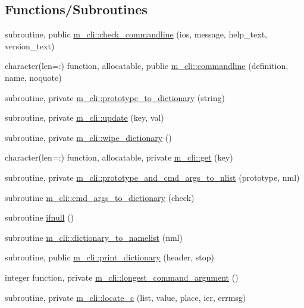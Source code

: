 \subsection*{Functions/\+Subroutines}
\begin{DoxyCompactItemize}
\item 
subroutine, public \mbox{\hyperlink{namespacem__cli_a62056f0c153eb63cb0b11a21edb028cd}{m\+\_\+cli\+::check\+\_\+commandline}} (ios, message, help\+\_\+text, version\+\_\+text)
\item 
character(len=\+:) function, allocatable, public \mbox{\hyperlink{namespacem__cli_a4f639b0c4bf16930fc1c5858ed4196a3}{m\+\_\+cli\+::commandline}} (definition, name, noquote)
\item 
subroutine, private \mbox{\hyperlink{namespacem__cli_a8c62537a2d224364c9cb30005be819e9}{m\+\_\+cli\+::prototype\+\_\+to\+\_\+dictionary}} (string)
\item 
subroutine, private \mbox{\hyperlink{namespacem__cli_a9b7676d796e5cb878ecd9294b8a689cb}{m\+\_\+cli\+::update}} (key, val)
\item 
subroutine, private \mbox{\hyperlink{namespacem__cli_a3c1b30406fc692841826be979726bb1b}{m\+\_\+cli\+::wipe\+\_\+dictionary}} ()
\item 
character(len=\+:) function, allocatable, private \mbox{\hyperlink{namespacem__cli_a45783c194a1484042f63c58b180ca8df}{m\+\_\+cli\+::get}} (key)
\item 
subroutine, private \mbox{\hyperlink{namespacem__cli_ac77d70573b34ade2079cc4004a6acba5}{m\+\_\+cli\+::prototype\+\_\+and\+\_\+cmd\+\_\+args\+\_\+to\+\_\+nlist}} (prototype, nml)
\item 
subroutine \mbox{\hyperlink{namespacem__cli_a89a63254465b02048f09541e51974764}{m\+\_\+cli\+::cmd\+\_\+args\+\_\+to\+\_\+dictionary}} (check)
\item 
subroutine \mbox{\hyperlink{M__CLI_8f90_aa26f90016621d1ee43d3b5b66316532b}{ifnull}} ()
\item 
subroutine \mbox{\hyperlink{namespacem__cli_a7e5041efcad56387232475a3ae728634}{m\+\_\+cli\+::dictionary\+\_\+to\+\_\+namelist}} (nml)
\item 
subroutine, public \mbox{\hyperlink{namespacem__cli_a5b6abaf1d5aec5e918be0759df29c849}{m\+\_\+cli\+::print\+\_\+dictionary}} (header, stop)
\item 
integer function, private \mbox{\hyperlink{namespacem__cli_aaf5504d3b48696a9d22fa5773c5a7d15}{m\+\_\+cli\+::longest\+\_\+command\+\_\+argument}} ()
\item 
subroutine, private \mbox{\hyperlink{namespacem__cli_ade3d1e36f0fc6a47b5469dcd8ade5312}{m\+\_\+cli\+::locate\+\_\+c}} (list, value, place, ier, errmsg)

\end{DoxyCompactItemize}
